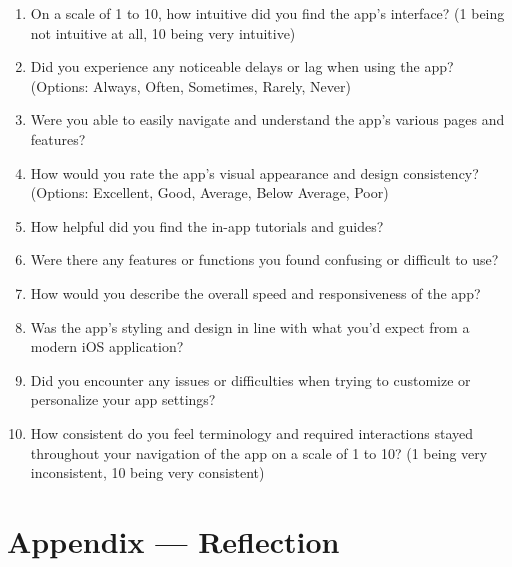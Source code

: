 \documentclass[12pt, titlepage]{article}
\begin{document}
    \begin{enumerate}
        \item On a scale of 1 to 10, how intuitive did you find the app's interface? (1 being not intuitive at all, 10 being very intuitive)
        \item Did you experience any noticeable delays or lag when using the app? (Options: Always, Often, Sometimes, Rarely, Never)
        \item Were you able to easily navigate and understand the app's various pages and features?
        \item How would you rate the app's visual appearance and design consistency? (Options: Excellent, Good, Average, Below Average, Poor)
        \item How helpful did you find the in-app tutorials and guides?
        \item Were there any features or functions you found confusing or difficult to use?
        \item How would you describe the overall speed and responsiveness of the app?
        \item Was the app's styling and design in line with what you'd expect from a modern iOS application?
        \item Did you encounter any issues or difficulties when trying to customize or personalize your app settings?
        \item How consistent do you feel terminology and required interactions stayed throughout your navigation of the app on a scale of 1 to 10? (1 being very inconsistent, 10 being very consistent)
    \end{enumerate}


    \newpage{}
    \section*{Appendix --- Reflection}
\end{document}
